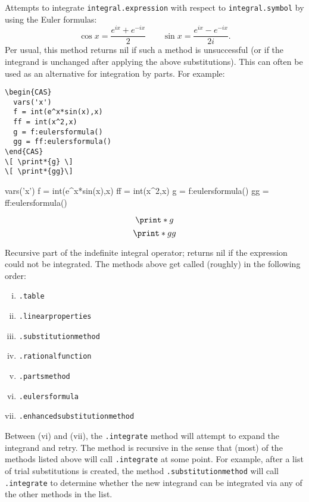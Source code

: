 
Attempts to integrate \texttt{integral.expression} with respect to \texttt{integral.symbol} by using the Euler formulas: 
\[ \cos x = \frac{e^{ix} + e^{-ix}}{2} \qquad \sin x = \frac{e^{ix} - e^{-ix}}{2i}.\]  
Per usual, this method returns nil if such a method is unsuccessful (or if the integrand is unchanged after applying the above substitutions). This can often be used as an alternative for integration by parts. For example:

\begin{codebox}
    \begin{verbatim}
\begin{CAS}
  vars('x')
  f = int(e^x*sin(x),x)
  ff = int(x^2,x)
  g = f:eulersformula()
  gg = ff:eulersformula()
\end{CAS}
\[ \print*{g} \] 
\[ \print*{gg}\]
\end{verbatim}
\tcblower
\begin{CAS}
    vars('x')
    f = int(e^x*sin(x),x)
    ff = int(x^2,x)
    g = f:eulersformula()
    gg = ff:eulersformula()
\end{CAS}
\[ \print*{g} \] 
\[ \print*{gg}\]
\end{codebox}


Recursive part of the indefinite integral operator; returns nil if the expression could not be integrated. The methods above get called (roughly) in the following order:
\begin{enumerate}[(i)]
    \item \texttt{.table}
    \item \texttt{.linearproperties}
    \item \texttt{.substitutionmethod}
    \item \texttt{.rationalfunction}
    \item \texttt{.partsmethod} 
    \item \texttt{.eulersformula} 
    \item \texttt{.enhancedsubstitutionmethod}
\end{enumerate}
Between (vi) and (vii), the \texttt{.integrate} method will attempt to expand the integrand and retry. The method is recursive in the sense that (most) of the methods listed above will call \texttt{.integrate} at some point. For example, after a list of trial substitutions is created, the method \texttt{.substitutionmethod} will call \texttt{.integrate} to determine whether the new integrand can be integrated via any of the other methods in the list. 

